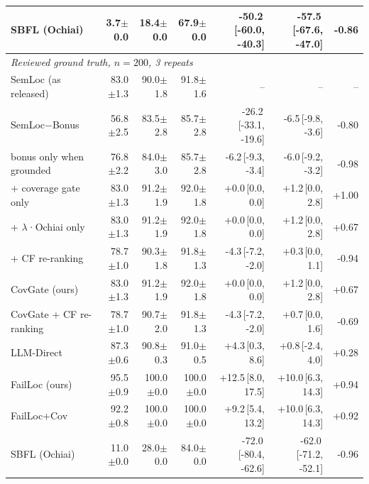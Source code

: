 \begin{tabular}{lrrrrrr}
SBFL (Ochiai) & 3.7{\scriptsize$\pm$0.0} & 18.4{\scriptsize$\pm$0.0} & 67.9{\scriptsize$\pm$0.0} & -50.2{\scriptsize\,[-60.0, -40.3]} & -57.5{\scriptsize\,[-67.6, -47.0]} & -0.86 \\
\midrule
\multicolumn{7}{l}{\emph{Reviewed ground truth, $n=200$, 3 repeats}} \\
SemLoc (as released) & 83.0{\scriptsize$\pm$1.3} & 90.0{\scriptsize$\pm$1.8} & 91.8{\scriptsize$\pm$1.6} & -- & -- & -- \\
SemLoc−Bonus & 56.8{\scriptsize$\pm$2.5} & 83.5{\scriptsize$\pm$2.8} & 85.7{\scriptsize$\pm$2.8} & -26.2{\scriptsize\,[-33.1, -19.6]} & -6.5{\scriptsize\,[-9.8, -3.6]} & -0.80 \\
\quad bonus only when grounded & 76.8{\scriptsize$\pm$2.2} & 84.0{\scriptsize$\pm$3.0} & 85.7{\scriptsize$\pm$2.8} & -6.2{\scriptsize\,[-9.3, -3.4]} & -6.0{\scriptsize\,[-9.2, -3.2]} & -0.98 \\
\quad + coverage gate only & 83.0{\scriptsize$\pm$1.3} & 91.2{\scriptsize$\pm$1.9} & 92.0{\scriptsize$\pm$1.8} & +0.0{\scriptsize\,[0.0, 0.0]} & +1.2{\scriptsize\,[0.0, 2.8]} & +1.00 \\
\quad + $\lambda$·Ochiai only & 83.0{\scriptsize$\pm$1.3} & 91.2{\scriptsize$\pm$1.9} & 92.0{\scriptsize$\pm$1.8} & +0.0{\scriptsize\,[0.0, 0.0]} & +1.2{\scriptsize\,[0.0, 2.8]} & +0.67 \\
\quad + CF re-ranking & 78.7{\scriptsize$\pm$1.0} & 90.3{\scriptsize$\pm$1.8} & 91.8{\scriptsize$\pm$1.3} & -4.3{\scriptsize\,[-7.2, -2.0]} & +0.3{\scriptsize\,[0.0, 1.1]} & -0.94 \\
CovGate (ours) & 83.0{\scriptsize$\pm$1.3} & 91.2{\scriptsize$\pm$1.9} & 92.0{\scriptsize$\pm$1.8} & +0.0{\scriptsize\,[0.0, 0.0]} & +1.2{\scriptsize\,[0.0, 2.8]} & +0.67 \\
CovGate + CF re-ranking & 78.7{\scriptsize$\pm$1.0} & 90.7{\scriptsize$\pm$2.0} & 91.8{\scriptsize$\pm$1.3} & -4.3{\scriptsize\,[-7.2, -2.0]} & +0.7{\scriptsize\,[0.0, 1.6]} & -0.69 \\
LLM-Direct & 87.3{\scriptsize$\pm$0.6} & 90.8{\scriptsize$\pm$0.3} & 91.0{\scriptsize$\pm$0.5} & +4.3{\scriptsize\,[0.3, 8.6]} & +0.8{\scriptsize\,[-2.4, 4.0]} & +0.28 \\
FailLoc (ours) & 95.5{\scriptsize$\pm$0.9} & 100.0{\scriptsize$\pm$0.0} & 100.0{\scriptsize$\pm$0.0} & +12.5{\scriptsize\,[8.0, 17.5]} & +10.0{\scriptsize\,[6.3, 14.3]} & +0.94 \\
FailLoc+Cov & 92.2{\scriptsize$\pm$0.8} & 100.0{\scriptsize$\pm$0.0} & 100.0{\scriptsize$\pm$0.0} & +9.2{\scriptsize\,[5.4, 13.2]} & +10.0{\scriptsize\,[6.3, 14.3]} & +0.92 \\
SBFL (Ochiai) & 11.0{\scriptsize$\pm$0.0} & 28.0{\scriptsize$\pm$0.0} & 84.0{\scriptsize$\pm$0.0} & -72.0{\scriptsize\,[-80.4, -62.6]} & -62.0{\scriptsize\,[-71.2, -52.1]} & -0.96 \\
\bottomrule
\end{tabular}
